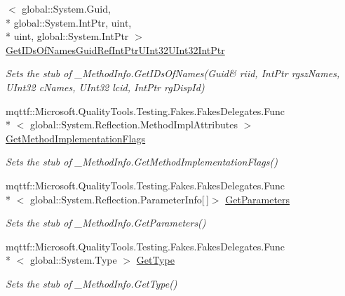 \begin{DoxyCompactItemize}
$<$ global\-::\-System.\-Guid, \\*
global\-::\-System.\-Int\-Ptr, uint, \\*
uint, global\-::\-System.\-Int\-Ptr $>$ \hyperlink{class_system_1_1_runtime_1_1_interop_services_1_1_fakes_1_1_stub___method_info_ac2049740a25975aadb1381509869386a}{Get\-I\-Ds\-Of\-Names\-Guid\-Ref\-Int\-Ptr\-U\-Int32\-U\-Int32\-Int\-Ptr}
\begin{DoxyCompactList}\small\item\em Sets the stub of \-\_\-\-Method\-Info.\-Get\-I\-Ds\-Of\-Names(Guid\& riid, Int\-Ptr rgsz\-Names, U\-Int32 c\-Names, U\-Int32 lcid, Int\-Ptr rg\-Disp\-Id)\end{DoxyCompactList}\item 
mqttf\-::\-Microsoft.\-Quality\-Tools.\-Testing.\-Fakes.\-Fakes\-Delegates.\-Func\\*
$<$ global\-::\-System.\-Reflection.\-Method\-Impl\-Attributes $>$ \hyperlink{class_system_1_1_runtime_1_1_interop_services_1_1_fakes_1_1_stub___method_info_a2dcddcb599c6251cd62e545df6cb3956}{Get\-Method\-Implementation\-Flags}
\begin{DoxyCompactList}\small\item\em Sets the stub of \-\_\-\-Method\-Info.\-Get\-Method\-Implementation\-Flags()\end{DoxyCompactList}\item 
mqttf\-::\-Microsoft.\-Quality\-Tools.\-Testing.\-Fakes.\-Fakes\-Delegates.\-Func\\*
$<$ global\-::\-System.\-Reflection.\-Parameter\-Info\mbox{[}$\,$\mbox{]}$>$ \hyperlink{class_system_1_1_runtime_1_1_interop_services_1_1_fakes_1_1_stub___method_info_a0286e7deddac284acd39c4235f92346a}{Get\-Parameters}
\begin{DoxyCompactList}\small\item\em Sets the stub of \-\_\-\-Method\-Info.\-Get\-Parameters()\end{DoxyCompactList}\item 
mqttf\-::\-Microsoft.\-Quality\-Tools.\-Testing.\-Fakes.\-Fakes\-Delegates.\-Func\\*
$<$ global\-::\-System.\-Type $>$ \hyperlink{class_system_1_1_runtime_1_1_interop_services_1_1_fakes_1_1_stub___method_info_a6e878103b343d0fa6dddf8149b922031}{Get\-Type}
\begin{DoxyCompactList}\small\item\em Sets the stub of \-\_\-\-Method\-Info.\-Get\-Type()\end{DoxyCompactList}\item 

\end{DoxyCompactItemize}
